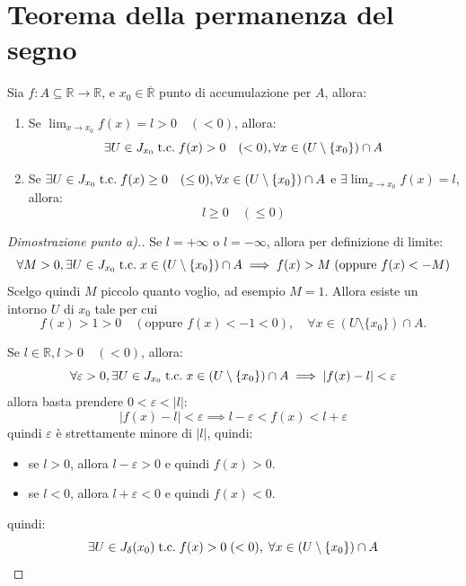 \documentclass[a4paper,12pt,openright]{book}
\begin{document}
	\section{Teorema della permanenza del segno}
	Sia $f: A \subseteq \mathbb{R} \longrightarrow \mathbb{R}$, e $x_0 \in \overline{\mathbb{R}}$ punto di accumulazione per $A$, allora:
	\begin{enumerate}[label=\alph*)]
		\item Se $\lim_{x \rightarrow x_0} f(x) = l > 0 \quad (< 0)$, allora:
		\[\exists U \in J_{x_0} \;\text{t.c.}\; f(x) > 0 \quad (< 0), \forall x \in (U \setminus \{x_0\}) \cap A\]
		\item Se $\exists U \in J_{x_0} \;\text{t.c.}\; f(x) \geq 0 \quad (\leq 0), \forall x \in (U \setminus \{x_0\}) \cap A$ e $\exists \lim_{x \rightarrow x_0} f(x) = l$, allora:
		\[l \geq 0 \quad (\leq 0)\]
	\end{enumerate}
	\begin{proof}[Dimostrazione punto a).]
		Se $l = +\infty$ o $l = -\infty$, allora per definizione di limite:
		\[\forall M > 0, \exists U \in J_{x_0} \;\text{t.c.}\; x \in (U \setminus \{x_0\}) \cap A \implies f(x) > M \; (\text{oppure } f(x) < -M)\]
		Scelgo quindi $M$ piccolo quanto voglio, ad esempio $M = 1$. Allora esiste un intorno $U$ di $x_0$ tale per cui
		\[f(x) > 1 > 0 \quad (\text{oppure } f(x) < -1 < 0), \quad \forall x \in (U \setminus \{x_0\}) \cap A.\]
		
		Se $l \in \mathbb{R}, l > 0 \quad (< 0)$, allora:
		\[\forall \varepsilon > 0, \exists U \in J_{x_0} \;\text{t.c.}\; x \in (U \setminus \{x_0\}) \cap A \implies |f(x) - l| < \varepsilon\]
		allora basta prendere $0 < \varepsilon < |l|$:
		\[|f(x) - l| < \varepsilon \implies l - \varepsilon < f(x) < l + \varepsilon\]
		quindi $\varepsilon$ è strettamente minore di $|l|$, quindi:
		\begin{itemize}
			\item se $l > 0$, allora $l - \varepsilon > 0$ e quindi $f(x) > 0$.  
			\item se $l < 0$, allora $l + \varepsilon < 0$ e quindi $f(x) < 0$.
		\end{itemize}
		quindi:
		\[\exists U \in J_\delta(x_0) \;\text{t.c.}\; f(x) > 0 \; (< 0), \; \forall x \in (U \setminus \{x_0\}) \cap A\]
	\end{proof}
	
	\newpage
	
\end{document}
